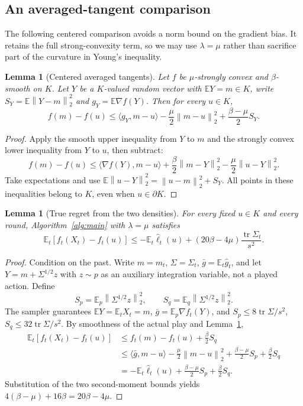 \documentclass[11pt]{article}
\numberwithin{equation}{section}
\newcommand{\E}{\mathbb E}
\newcommand{\tr}{\operatorname{tr}}
\newcommand{\ip}[2]{\langle #1,#2\rangle}
\newcommand{\norm}[1]{\left\|#1\right\|}
\newtheorem{lemma}[theorem]{Lemma}
\theoremstyle{definition}
\theoremstyle{remark}
\begin{document}
\subsection{An averaged-tangent comparison}
The following centered comparison avoids a norm bound on the gradient bias.
It retains the full strong-convexity term, so we may use
$\lambda=\mu$ rather than sacrifice part of the curvature in Young's inequality.

\begin{lemma}[Centered averaged tangents]\label{lem:tangent}
Let $f$ be $\mu$-strongly convex and $\beta$-smooth on $K$. Let $Y$ be a
$K$-valued random vector with $\E Y=m\in K$, write
$S_Y=\E\norm{Y-m}_2^2$ and $g_Y=\E\nabla f(Y)$. Then for every $u\in K$,
\begin{equation}\label{eq:tangent}
 f(m)-f(u)\leq\ip{g_Y}{m-u}-\frac\mu2\norm{m-u}_2^2
                         +\frac{\beta-\mu}{2}S_Y.
\end{equation}
\end{lemma}
\begin{proof}
Apply the smooth upper inequality from $Y$ to $m$ and the strongly convex
lower inequality from $Y$ to $u$, then subtract:
\[
 f(m)-f(u)\leq\ip{\nabla f(Y)}{m-u}
            +\frac\beta2\norm{m-Y}_2^2
            -\frac\mu2\norm{u-Y}_2^2.
\]
Take expectations and use
$\E\norm{u-Y}_2^2=\norm{u-m}_2^2+S_Y$. All points in these inequalities
belong to $K$, even when $u\in\partial K$.
\end{proof}

\begin{lemma}[True regret from the two densities]\label{lem:regtransfer}
For every fixed $u\in K$ and every round, Algorithm~\ref{alg:main} with
$\lambda=\mu$ satisfies
\begin{equation}\label{eq:regtransfer}
 \E_t[f_t(X_t)-f_t(u)]
 \leq-\E_t\widehat\ell_t(u)
          +(20\beta-4\mu)\frac{\tr\Sigma_t}{s^2}.
\end{equation}
\end{lemma}
\begin{proof}
Condition on the past. Write $m=m_t$, $\Sigma=\Sigma_t$,
$\bar g=\E_t\widehat g_t$, and let $Y=m+\Sigma^{1/2}z$ with $z\sim p$ as an
auxiliary integration variable, not a played action. Define
\[
 S_p=\E_p\norm{\Sigma^{1/2}z}_2^2,\qquad
 S_q=\E_q\norm{\Sigma^{1/2}z}_2^2.
\]
The sampler guarantees $\E Y=\E_tX_t=m$,
$\bar g=\E_p\nabla f_t(Y)$, and
$S_p\leq8\tr\Sigma/s^2$, $S_q\leq32\tr\Sigma/s^2$.
By smoothness of the actual play and Lemma~\ref{lem:tangent},
\begin{align*}
 \E_t[f_t(X_t)-f_t(u)]
 &\leq f_t(m)-f_t(u)+\frac\beta2S_q\\
 &\leq\ip{\bar g}{m-u}-\frac\mu2\norm{m-u}_2^2
                +\frac{\beta-\mu}{2}S_p+\frac\beta2S_q\\
 &=-\E_t\widehat\ell_t(u)
                +\frac{\beta-\mu}{2}S_p+\frac\beta2S_q.
\end{align*}
Substitution of the two second-moment bounds yields
$4(\beta-\mu)+16\beta=20\beta-4\mu$.
\end{proof}
\end{document}
